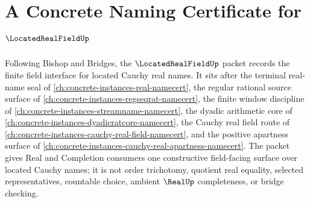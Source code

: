 \chapter{A Concrete Naming Certificate for $\LocatedRealFieldUp$}
\label{ch:concrete-instances-located-real-field-namecert}

Following Bishop and Bridges, the $\LocatedRealFieldUp$ packet records the finite field interface for located Cauchy real names. It sits after the terminal real-name seal of \autoref{ch:concrete-instances-real-namecert}, the regular rational source surface of \autoref{ch:concrete-instances-regseqrat-namecert}, the finite window discipline of \autoref{ch:concrete-instances-streamname-namecert}, the dyadic arithmetic core of \autoref{ch:concrete-instances-dyadicratcore-namecert}, the Cauchy real field route of \autoref{ch:concrete-instances-cauchy-real-field-namecert}, and the positive apartness surface of \autoref{ch:concrete-instances-cauchy-real-apartness-namecert}. The packet gives Real and Completion consumers one constructive field-facing surface over located Cauchy names; it is not order trichotomy, quotient real equality, selected representatives, countable choice, ambient $\RealUp$ completeness, or bridge checking.

